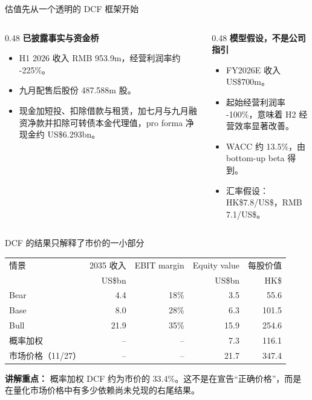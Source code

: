 \documentclass[aspectratio=169,11pt]{beamer}
\newcommand{\smallnote}[1]{\vspace{0.2em}{\footnotesize #1}}
\begin{document}
\begin{frame}{估值先从一个透明的 DCF 框架开始}
  \begin{columns}[T,onlytextwidth]
    \begin{column}{0.48\textwidth}
      \textbf{已披露事实与资金桥}
      \begin{itemize}
        \item H1 2026 收入 RMB 953.9m，经营利润率约 -225\%。
        \item 九月配售后股份 487.588m 股。
        \item 现金加短投、扣除借款与租赁，加七月与九月融资净款并扣除可转债本金代理值，pro forma 净现金约 US\$6.293bn。
      \end{itemize}
    \end{column}
    \begin{column}{0.48\textwidth}
      \textbf{模型假设，不是公司指引}
      \begin{itemize}
        \item FY2026E 收入 US\$700m。
        \item 起始经营利润率 -100\%，意味着 H2 经营效率显著改善。
        \item WACC 约 13.5\%，由 bottom-up beta 得到。
        \item 汇率假设：HK\$7.8/US\$，RMB 7.1/US\$。
      \end{itemize}
    \end{column}
  \end{columns}
  \smallnote{US\$6.293bn 为六月余额加后续融资并扣债的估值桥；不含未披露期后消耗，本金代理值并非公允价值。}
\end{frame}

\begin{frame}{DCF 的结果只解释了市价的一小部分}
  \vspace{-0.4em}
  \begin{table}
    \centering
    \scriptsize
    \begin{tabular}{lrrrr}
      \toprule
      情景 & 2035 收入 & EBIT margin & Equity value & 每股价值 \\
      & US\$bn & & US\$bn & HK\$ \\
      \midrule
      Bear & 4.4 & 18\% & 3.5 & 55.6 \\
      Base & 8.0 & 28\% & 6.3 & 101.5 \\
      Bull & 21.9 & 35\% & 15.9 & 254.6 \\
      \midrule
      概率加权 & -- & -- & 7.3 & 116.1 \\
      市场价格（11/27） & -- & -- & 21.7 & 347.4 \\
      \bottomrule
    \end{tabular}
  \end{table}
  \textbf{讲解重点：} 概率加权 DCF 约为市价的 33.4\%。这不是在宣告“正确价格”，而是在量化市场价格中有多少依赖尚未兑现的右尾结果。
\end{frame}
\end{document}
